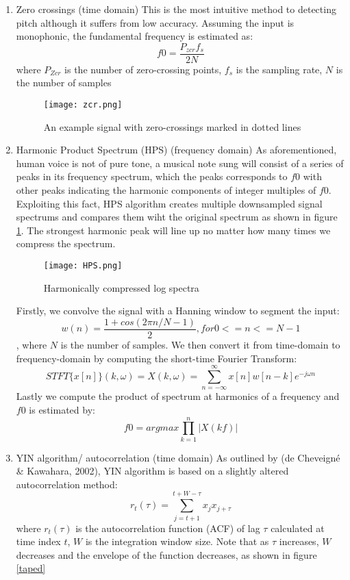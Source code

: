 \begin{enumerate}
	\item Zero crossings (time domain)
	This is the most intuitive method to detecting pitch although it suffers from low accuracy.
	Assuming the input is monophonic, the fundamental frequency is estimated as:
	\[f0 = \frac{P_{zcr}f_s}{2N}\]
	where $P_{Zcr}$ is the number of zero-crossing points, $f_s$ is the sampling rate,
	$N$ is the number of samples
	\begin{figure}
		\texttt{[image: zcr.png]}
		\caption{An example signal with zero-crossings marked in dotted lines \cite{zcr}}
	\end{figure}

	\item Harmonic Product Spectrum (HPS) (frequency domain)
	As aforementioned, human voice is not of pure tone, a musical note sung will consist of a series of peaks in its frequency spectrum,
	which the peaks corresponds to $f0$ with other peaks indicating the harmonic components of integer multiples of $f0$. 
	Exploiting this fact, HPS algorithm creates multiple downsampled signal spectrums and compares them wiht the original spectrum as shown in figure 
	\ref{HPS}. The strongest harmonic peak will line up no matter how many times we compress the spectrum.
	
	\begin{figure}
		\texttt{[image: HPS.png]}
		\caption{Harmonically compressed log spectra \cite{HPS}}
		\label{HPS}
	\end{figure}
	
	Firstly, we convolve the signal with a Hanning window to segment the input:
	\[w(n) = \frac{1+cos(2\pi n/N-1)}{2}, for 0<= n<= N-1\], where $N$ is the number of samples.
	We then convert it from time-domain to frequency-domain by computing the short-time Fourier Transform:
	\[STFT \{x[n]\}(k,\omega) = X(k,\omega )= \sum _{n=-\infty }^{\infty }x[n]w[n-k]e^{-j\omega n}\]
	Lastly we compute the product of spectrum at harmonics of a frequency and $f0$ is estimated by:
	\[f0 = argmax\prod_{k=1}^{n}|X(kf)|\] 

	\item YIN algorithm/ autocorrelation (time domain)
	As outlined by (de Cheveigné \& Kawahara, 2002), YIN algorithm is based on a slightly altered autocorrelation method:
	\[r_t(\tau)=\sum_{j=t+1}^{t+W-\tau}x_j x_{j+\tau}\]
	where $r_t(\tau)$ is the autocorrelation function (ACF) of lag $\tau$ calculated at time index $t$, $W$ is the integration
	window size. Note that as $\tau$ increases, $W$ decreases and the envelope of the function decreases, as shown in figure 
	\ref{taped}


\end{enumerate}
